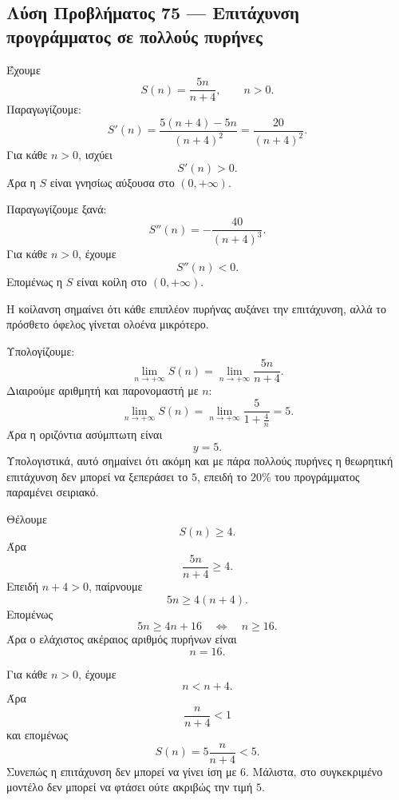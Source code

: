 \subsection*{Λύση Προβλήματος 75 --- Επιτάχυνση προγράμματος σε πολλούς πυρήνες}

\begin{alist}
  \item Έχουμε
        \[
          S(n)=\frac{5n}{n+4},\qquad n>0.
        \]
        Παραγωγίζουμε:
        \[
          S'(n)
          =
          \frac{5(n+4)-5n}{(n+4)^2}
          =
          \frac{20}{(n+4)^2}.
        \]
        Για κάθε \(n>0\), ισχύει
        \[
          S'(n)>0.
        \]
        Άρα η \(S\) είναι γνησίως αύξουσα στο \((0,+\infty)\).

        Παραγωγίζουμε ξανά:
        \[
          S''(n)=-\frac{40}{(n+4)^3}.
        \]
        Για κάθε \(n>0\), έχουμε
        \[
          S''(n)<0.
        \]
        Επομένως η \(S\) είναι κοίλη στο \((0,+\infty)\).

        Η κοίλανση σημαίνει ότι κάθε επιπλέον πυρήνας αυξάνει την
        επιτάχυνση, αλλά το πρόσθετο όφελος γίνεται ολοένα μικρότερο.

  \item Υπολογίζουμε:
        \[
          \lim_{n\to+\infty}S(n)
          =
          \lim_{n\to+\infty}\frac{5n}{n+4}.
        \]
        Διαιρούμε αριθμητή και παρονομαστή με \(n\):
        \[
          \lim_{n\to+\infty}S(n)
          =
          \lim_{n\to+\infty}
          \frac{5}{1+\frac{4}{n}}
          =
          5.
        \]
        Άρα η οριζόντια ασύμπτωτη είναι
        \[
          {y=5}.
        \]
        Υπολογιστικά, αυτό σημαίνει ότι ακόμη και με πάρα πολλούς
        πυρήνες η θεωρητική επιτάχυνση δεν μπορεί να ξεπεράσει το
        \(5\), επειδή το \(20\%\) του προγράμματος παραμένει σειριακό.

  \item Θέλουμε
        \[
          S(n)\geq4.
        \]
        Άρα
        \[
          \frac{5n}{n+4}\geq4.
        \]
        Επειδή \(n+4>0\), παίρνουμε
        \[
          5n\geq4(n+4).
        \]
        Επομένως
        \[
          5n\geq4n+16
          \quad\Leftrightarrow\quad
          n\geq16.
        \]
        Άρα ο ελάχιστος ακέραιος αριθμός πυρήνων είναι
        \[
          {n=16}.
        \]

  \item Για κάθε \(n>0\), έχουμε
        \[
          n<n+4.
        \]
        Άρα
        \[
          \frac{n}{n+4}<1
        \]
        και επομένως
        \[
          S(n)=5\frac{n}{n+4}<5.
        \]
        Συνεπώς η επιτάχυνση δεν μπορεί να γίνει ίση με \(6\).
        Μάλιστα, στο συγκεκριμένο μοντέλο δεν μπορεί να φτάσει ούτε
        ακριβώς την τιμή \(5\).
\end{alist}

